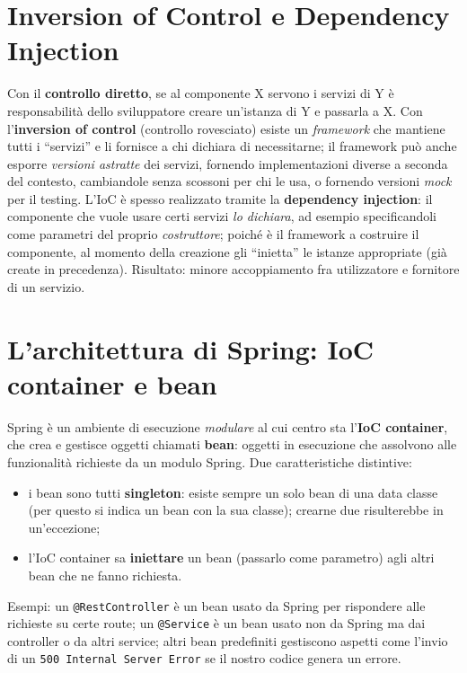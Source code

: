 \section{Inversion of Control e Dependency Injection}

\begin{definizione}[IoC e DI]
Con il \textbf{controllo diretto}, se al componente X servono i servizi di Y \`e
responsabilit\`a dello sviluppatore creare un'istanza di Y e passarla a X. Con
l'\textbf{inversion of control} (controllo rovesciato) esiste un \emph{framework} che
mantiene tutti i ``servizi'' e li fornisce a chi dichiara di necessitarne; il framework
pu\`o anche esporre \emph{versioni astratte} dei servizi, fornendo implementazioni diverse a
seconda del contesto, cambiandole senza scossoni per chi le usa, o fornendo versioni
\emph{mock} per il testing. L'IoC \`e spesso realizzato tramite la
\textbf{dependency injection}: il componente che vuole usare certi servizi \emph{lo
dichiara}, ad esempio specificandoli come parametri del proprio \emph{costruttore}; poich\'e
\`e il framework a costruire il componente, al momento della creazione gli ``inietta'' le
istanze appropriate (gi\`a create in precedenza). Risultato: minore accoppiamento fra
utilizzatore e fornitore di un servizio.
\end{definizione}

\section{L'architettura di Spring: IoC container e bean}

\begin{definizione}
Spring \`e un ambiente di esecuzione \emph{modulare} al cui centro sta
l'\textbf{IoC container}, che crea e gestisce oggetti chiamati \textbf{bean}: oggetti in
esecuzione che assolvono alle funzionalit\`a richieste da un modulo Spring. Due
caratteristiche distintive:
\begin{itemize}
  \item i bean sono tutti \textbf{singleton}: esiste sempre un solo bean di una data classe
        (per questo si indica un bean con la sua classe); crearne due risulterebbe in
        un'eccezione;
  \item l'IoC container sa \textbf{iniettare} un bean (passarlo come parametro) agli altri
        bean che ne fanno richiesta.
\end{itemize}
Esempi: un \texttt{@RestController} \`e un bean usato da Spring per rispondere alle richieste
su certe route; un \texttt{@Service} \`e un bean usato non da Spring ma dai controller o da
altri service; altri bean predefiniti gestiscono aspetti come l'invio di un
\texttt{500 Internal Server Error} se il nostro codice genera un errore.
\end{definizione}


